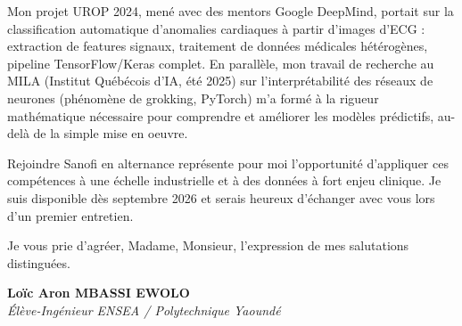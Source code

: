 \documentclass[a4paper,11pt]{article}
\begin{document}
Mon projet UROP 2024, mené avec des mentors Google DeepMind, portait sur la classification automatique d'anomalies cardiaques à partir d'images d'ECG : extraction de features signaux, traitement de données médicales hétérogènes, pipeline TensorFlow/Keras complet. En parallèle, mon travail de recherche au MILA (Institut Québécois d'IA, été 2025) sur l'interprétabilité des réseaux de neurones (phénomène de grokking, PyTorch) m'a formé à la rigueur mathématique nécessaire pour comprendre et améliorer les modèles prédictifs, au-delà de la simple mise en oeuvre.

Rejoindre Sanofi en alternance représente pour moi l'opportunité d'appliquer ces compétences à une échelle industrielle et à des données à fort enjeu clinique. Je suis disponible dès septembre 2026 et serais heureux d'échanger avec vous lors d'un premier entretien.

Je vous prie d'agréer, Madame, Monsieur, l'expression de mes salutations distinguées.

\vspace{0.8cm}

\textbf{Loïc Aron MBASSI EWOLO}\\
\textit{Élève-Ingénieur ENSEA / Polytechnique Yaoundé}
\end{document}
